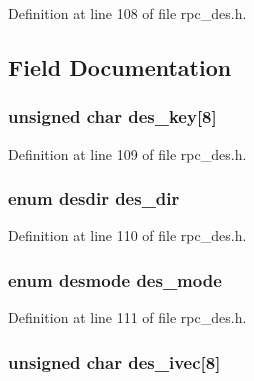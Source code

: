 Definition at line 108 of file rpc\+\_\+des.\+h.



\subsection{Field Documentation}
\subsubsection[{\texorpdfstring{des\+\_\+key}{des_key}}]{\setlength{\rightskip}{0pt plus 5cm}unsigned char des\+\_\+key\mbox{[}8\mbox{]}}\hypertarget{structdesparams_a2236ec74b4cf651a0b604e916f5034a6}{}\label{structdesparams_a2236ec74b4cf651a0b604e916f5034a6}


Definition at line 109 of file rpc\+\_\+des.\+h.

\subsubsection[{\texorpdfstring{des\+\_\+dir}{des_dir}}]{\setlength{\rightskip}{0pt plus 5cm}enum {\bf desdir} des\+\_\+dir}\hypertarget{structdesparams_a4afc5696546ba005d064670c15dca7c9}{}\label{structdesparams_a4afc5696546ba005d064670c15dca7c9}


Definition at line 110 of file rpc\+\_\+des.\+h.

\subsubsection[{\texorpdfstring{des\+\_\+mode}{des_mode}}]{\setlength{\rightskip}{0pt plus 5cm}enum {\bf desmode} des\+\_\+mode}\hypertarget{structdesparams_a808268ae9a3b3cc0b4bf3cbe04a9b173}{}\label{structdesparams_a808268ae9a3b3cc0b4bf3cbe04a9b173}


Definition at line 111 of file rpc\+\_\+des.\+h.

\subsubsection[{\texorpdfstring{des\+\_\+ivec}{des_ivec}}]{\setlength{\rightskip}{0pt plus 5cm}unsigned char des\+\_\+ivec\mbox{[}8\mbox{]}}\hypertarget{structdesparams_a311466c2319dee22041d751ce085cadd}{}\label{structdesparams_a311466c2319dee22041d751ce085cadd}



